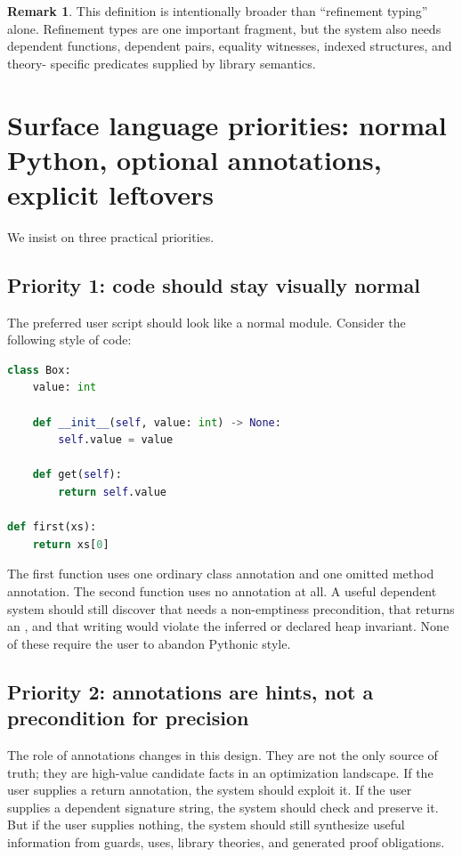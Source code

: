 \documentclass[11pt]{article}
\newcommand{\py}[1]{\texttt{\detokenize{#1}}}
\theoremstyle{definition}
\newtheorem{remark}[definition]{Remark}
\theoremstyle{plain}
\begin{document}
\begin{remark}
This definition is intentionally broader than ``refinement typing'' alone.
Refinement types are one important fragment, but the system also needs dependent
functions, dependent pairs, equality witnesses, indexed structures, and theory-
specific predicates supplied by library semantics.
\end{remark}



\section{Surface language priorities: normal Python, optional annotations, explicit leftovers}

We insist on three practical priorities.

\subsection{Priority 1: code should stay visually normal}
The preferred user script should look like a normal module. Consider the
following style of code:
\begin{lstlisting}[style=deppy,language=Python]
class Box:
    value: int

    def __init__(self, value: int) -> None:
        self.value = value

    def get(self):
        return self.value

def first(xs):
    return xs[0]
\end{lstlisting}
The first function uses one ordinary class annotation and one omitted method
annotation. The second function uses no annotation at all. A useful dependent
system should still discover that \py{first} needs a non-emptiness precondition,
that \py{Box.get} returns an \py{int}, and that writing \py{self.value = "oops"}
would violate the inferred or declared heap invariant. None of these require the
user to abandon Pythonic style.

\subsection{Priority 2: annotations are hints, not a precondition for precision}
The role of annotations changes in this design. They are not the only source of
truth; they are high-value candidate facts in an optimization landscape. If the
user supplies a return annotation, the system should exploit it. If the user
supplies a dependent signature string, the system should check and preserve it.
But if the user supplies nothing, the system should still synthesize useful
information from guards, uses, library theories, and generated proof
obligations.
\end{document}
